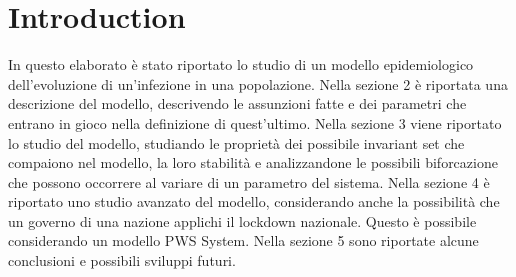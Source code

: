 \section{Introduction}
In questo elaborato è stato riportato lo studio di un modello epidemiologico dell'evoluzione di un'infezione in una popolazione.
Nella sezione 2 è riportata una descrizione del modello, descrivendo le assunzioni fatte e dei parametri che entrano in gioco nella definizione di quest'ultimo.
Nella sezione 3 viene riportato lo studio del modello, studiando le proprietà dei possibile invariant set che compaiono nel modello, la loro stabilità e analizzandone le possibili biforcazione che possono occorrere al variare di un parametro del sistema.
Nella sezione 4 è riportato uno studio avanzato del modello, considerando anche la possibilità che un governo di una nazione applichi il lockdown nazionale. Questo è possibile considerando un modello PWS System.
Nella sezione 5 sono riportate alcune conclusioni e possibili sviluppi futuri.